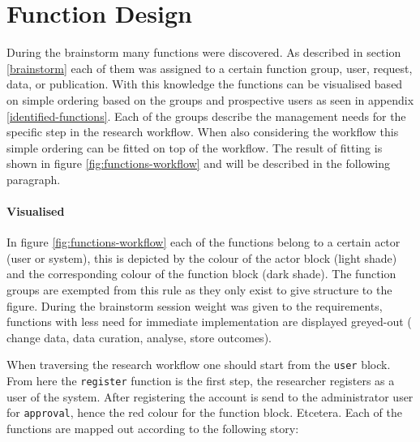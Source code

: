 \section{Function Design}
\label{function-design}

During the brainstorm many functions were discovered.
As described in section \ref{brainstorm} each of them was assigned to a certain function group, \ie{} user, request, data, or publication.
With this knowledge the functions can be visualised based on simple ordering based on the groups and prospective users as seen in appendix \ref{identified-functions}.
Each of the groups describe the management needs for the specific step in the research workflow.
When also considering the workflow this simple ordering can be fitted on top of the workflow.
The result of fitting is shown in figure \ref{fig:functions-workflow} and will be described in the following paragraph.

\paragraph{Visualised}
In figure \ref{fig:functions-workflow} each of the functions belong to a certain actor (user or system), this is depicted by the colour of the actor block (light shade) and the corresponding colour of the function block (dark shade).
The function groups are exempted from this rule as they only exist to give structure to the figure.
During the brainstorm session weight was given to the requirements, functions with less need for immediate implementation are displayed greyed-out (\ie{} change data, data curation, analyse, store outcomes).

When traversing the research workflow one should start from the {\tt user} block.
From here the {\tt register} function is the first step, the researcher registers as a user of the system.
After registering the account is send to the administrator user for {\tt approval}, hence the red colour for the function block.
Etcetera.
Each of the functions are mapped out according to the following story:

